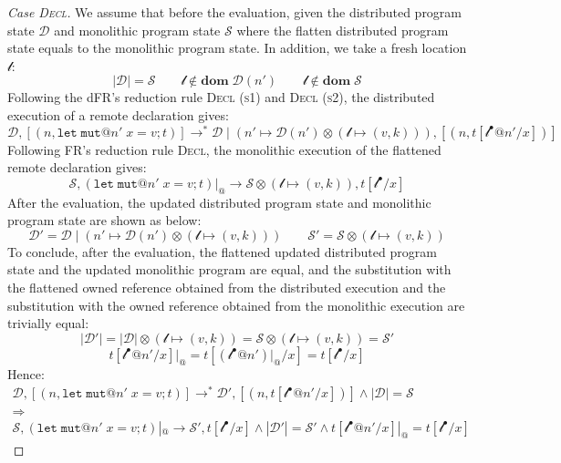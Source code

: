 \begin{proof}[Case \textsc{\emph{Decl}}]
We assume that before the evaluation, given the distributed program state $\mathcal{D}$ and monolithic program state $\mathcal{S}$ where the flatten distributed program state equals to the monolithic program state. In addition, we take a fresh location $\mathscr{l}$:
\[
|\mathcal{D}| = \mathcal{S} \quad\quad \mathscr{l} \notin \textbf{dom}\; \mathcal{D}(n') \quad\quad \mathscr{l} \notin \textbf{dom}\; \mathcal{S}
\]
Following the dFR's reduction rule \textsc{Decl (s1)} and \textsc{Decl (s2)}, the distributed execution of a remote declaration gives:
\[
\mathcal{D}, [(n, \texttt{let}\;\texttt{mut}@n'\;x = v;t)] \longrightarrow^* \mathcal{D} \mid (n' \mapsto \mathcal{D}(n')\otimes(\mathscr{l} \mapsto (v, k))), [(n, t[\mathscr{l}^\bullet@n'/x])]
\]
Following FR's reduction rule \textsc{Decl}, the monolithic execution of the flattened remote declaration gives:
\[
\mathcal{S}, (\texttt{let}\;\texttt{mut}@n'\;x = v;t)|_@ \longrightarrow \mathcal{S} \otimes (\mathscr{l} \mapsto (v, k)), t[\mathscr{l}^\bullet/x]
\]
After the evaluation, the updated distributed program state and monolithic program state are shown as below:
\[
\mathcal{D}' = \mathcal{D} \mid (n' \mapsto \mathcal{D}(n')\otimes(\mathscr{l} \mapsto (v, k))) \quad\quad
\mathcal{S}' = \mathcal{S} \otimes (\mathscr{l} \mapsto (v, k))
\]
To conclude, after the evaluation, the flattened updated distributed program state and the updated monolithic program are equal, and the substitution with the flattened owned reference obtained from the distributed execution and the substitution with the owned reference obtained from the monolithic execution are trivially equal:
\[
|\mathcal{D}'| = |\mathcal{D}| \otimes (\mathscr{l} \mapsto (v, k)) = \mathcal{S} \otimes (\mathscr{l} \mapsto (v, k)) = \mathcal{S}'\]\[ t[\mathscr{l}^\bullet@n'/x]|_@ = t[(\mathscr{l}^\bullet@n')|_@/x] = t[\mathscr{l}^\bullet/x]
\]
Hence:
\begin{gather*}
\mathcal{D}, [(n, \texttt{let}\;\texttt{mut}@n'\;x = v;t)] \longrightarrow^* \mathcal{D'}, [(n, t[\mathscr{l}^\bullet@n'/x])] \land |\mathcal{D}| = \mathcal{S} \\\Rightarrow\\ \mathcal{S}, (\texttt{let}\;\texttt{mut}@n'\;x = v;t)|_@ \longrightarrow \mathcal{S'}, t[\mathscr{l}^\bullet/x] \land |\mathcal{D}'| = \mathcal{S}' \land t[\mathscr{l}^\bullet@n'/x]|_@ = t[\mathscr{l}^\bullet/x]
\end{gather*}

\end{proof}
